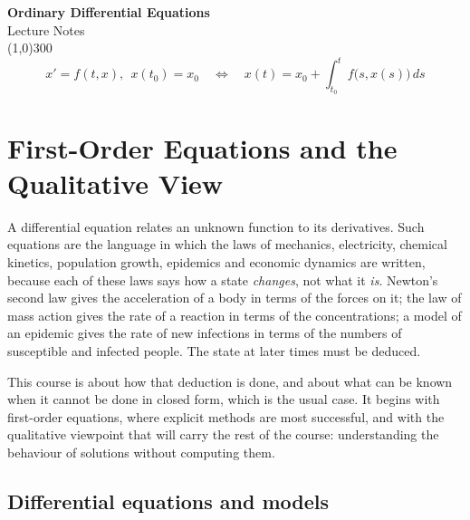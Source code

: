 \documentclass[11pt,a4paper]{article}
\numberwithin{equation}{section}
\theoremstyle{definition}
\begin{document}
\begin{titlepage}
\thispagestyle{empty}
\begin{center}
\vspace*{3cm}
{\Huge\bfseries Ordinary Differential Equations}\\[1.2cm]
{\large Lecture Notes}\\[2.5cm]
\line(1,0){300}\\[1.5cm]
$$x'=f(t,x),\ \ x(t_0)=x_0 \quad\Longleftrightarrow\quad x(t)=x_0+\int_{t_0}^{t}f\bigl(s,x(s)\bigr)\,ds$$
\end{center}
\end{titlepage}

\tableofcontents
\thispagestyle{empty}
\clearpage
\setcounter{page}{1}

\section{First-Order Equations and the Qualitative View}
\label{sec:first}

A differential equation relates an unknown function to its derivatives. Such equations are the language in which the laws of mechanics,
electricity, chemical kinetics, population growth, epidemics and economic dynamics are written, because each of these laws says how a state
\emph{changes}, not what it \emph{is}. Newton's second law gives the acceleration of a body in terms of the forces on it; the law of mass action gives
the rate of a reaction in terms of the concentrations; a model of an epidemic gives the rate of new infections in terms of the numbers of
susceptible and infected people. The state at later times must be deduced.

This course is about how that deduction is done, and about what can be known when it cannot be done in closed form, which is the usual case. It
begins with first-order equations, where explicit methods are most successful, and with the qualitative viewpoint that will carry the rest of the
course: understanding the behaviour of solutions without computing them.

\subsection{Differential equations and models}
\label{ssec:models}
\end{document}
